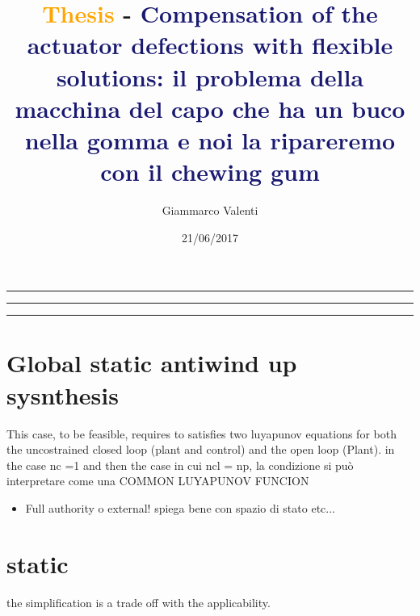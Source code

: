 \documentclass[twosided,a4paper]{article}           %
\date{21/06/2017}
\begin{document}
	
	\title{\textcolor{Orange}{Thesis} - \textcolor{MidnightBlue}{Compensation of the actuator defections with flexible solutions: il problema della macchina del capo che ha un buco nella gomma e noi la ripareremo con il chewing gum}}
	\author{Giammarco Valenti}
	\maketitle


\hrule
\hrule
\hrule

\section{Global static antiwind up sysnthesis}
This case, to be feasible, requires to satisfies two luyapunov equations for both the uncostrained closed loop (plant and control) and the open loop (Plant). in the case nc =1 and then the case in cui ncl = np, la condizione si può interpretare come una COMMON LUYAPUNOV FUNCION

\begin{itemize}
	\item Full authority o external! spiega bene con spazio di stato etc...
\end{itemize}

\section{static}
the simplification is a trade off with the applicability.
\end{document}
